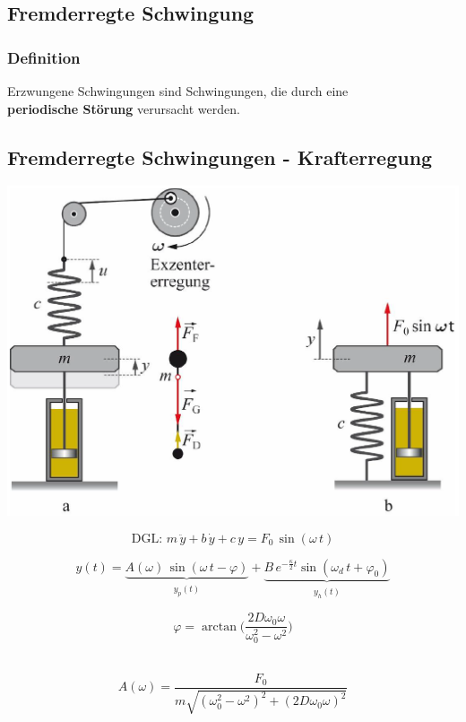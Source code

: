 \subsection{Fremderregte Schwingung}

\subsubsection{Definition}

Erzwungene Schwingungen sind Schwingungen, die durch eine \\
\textbf{periodische Störung} verursacht werden.



\subsection{Fremderregte Schwingungen - Krafterregung}
\includegraphics[width=0.75\linewidth]{Bilder/Wellen-Optik/krafterregung} 

$$ \boxed{ \text{DGL: } m \, \ddot{y} + b \, \dot{y} + c \, y = F_0 \, \sin(\omega \, t)  } $$  


$$ y(t) = \underbrace{ A(\omega) \, \sin(\omega \, t - \varphi) }_{\substack{y_p(t)}} + \underbrace{ B \, e^{- \frac{\kappa}{2} t} \sin(\omega_d \, t + \varphi_0)}_{\substack{y_h(t)}} $$

\begin{minipage}{0.3\linewidth}
$$ \boxed{ \varphi = \arctan \Big( \frac{2 D \omega_0 \omega}{\omega_0^2 - \omega^2}   \Big) } $$ \\
\end{minipage}
\hfill
\begin{minipage}{0.68\linewidth}
$$ \boxed{ A(\omega) = \frac{F_0}{m \sqrt{(\omega_0^2- \omega^2)^2 + (2 D \omega_0 \omega)^2 } } }$$ \\
\end{minipage}


